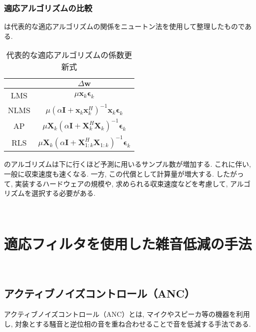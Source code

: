 \subsubsection{適応アルゴリズムの比較}\label{algo-compare}

は代表的な適応アルゴリズムの関係をニュートン法を使用して整理したものである. 

\begin{table}[H]
  \centering
  \caption{代表的な適応アルゴリズムの係数更新式}
  \label{tab:formula}
  \begin{tabular}{|c|c|}
  \hline
       & \(\Delta \bm{w}\)                                                                                             \\ \hline
  LMS  & \( \mu \bm{x}_k \bm{\epsilon}_k \)                                                                         \\ \hline
  NLMS & \( \mu \left( \alpha \bm{I} + \bm{x}_k \bm{x}_k^H \right)^{-1} \bm{x}_k \bm{\epsilon}_k \)        \\ \hline
  AP   & \(\mu \bm{X}_k \left( \alpha \bm{I} + \bm{X}_k^H \bm{X}_k \right)^{-1} \bm{\epsilon}_k\)          \\ \hline
  RLS  & \( \mu \bm{X}_k \left( \alpha \bm{I} + \bm{X}_{1:k}^H \bm{X}_{1:k} \right)^{-1} \bm{\epsilon}_k\) \\ \hline
  \end{tabular}
\end{table}

のアルゴリズムは下に行くほど予測に用いるサンプル数が増加する. これに伴い, 一般に収束速度も速くなる. 一方, この代償として計算量が増大する. したがって, 実装するハードウェアの規模や, 求められる収束速度などを考慮して, アルゴリズムを選択する必要がある. 

\
\section{適応フィルタを使用した雑音低減の手法}\label{adf-noise-reduction}

\
\subsection{アクティブノイズコントロール（ANC）}\label{anc}

アクティブノイズコントロール（ANC）とは, マイクやスピーカ等の機器を利用し, 対象とする騒音と逆位相の音を重ね合わせることで音を低減する手法である. 

